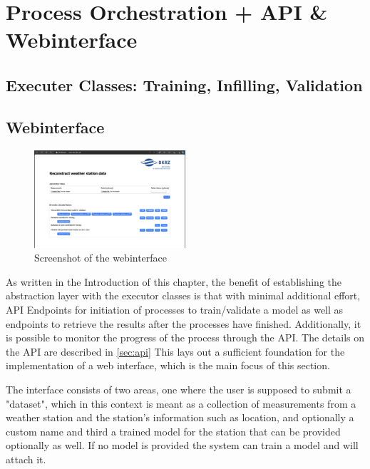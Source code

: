 
\section{Process Orchestration + API \& Webinterface}
\label{sec:process_orchestration}
\subsection{Executer Classes: Training, Infilling, Validation}


\subsection{Webinterface}

\begin{figure}
    \centering
    \includegraphics[width=0.5\textwidth]{resources/images/webinterface_screenshot.png}
    \caption{Screenshot of the webinterface}
    \label{fig:webinterface_screenshot}
\end{figure}

As written in the Introduction of this chapter, the benefit of establishing the abstraction layer with the executor classes is that with minimal additional effort, API Endpoints for initiation of processes to train/validate a model as well as endpoints to retrieve the results after the processes have finished. Additionally, it is possible to monitor the progress of the process through the API. The details on the API are described in \autoref{sec:api} This lays out a sufficient foundation for the implementation of a web interface, which is the main focus of this section.

The interface consists of two areas, one where the user is supposed to submit a "dataset", which in this context is meant as a collection of measurements from a weather station and the station's information such as location, and optionally a custom name and third a trained model for the station that can be provided optionally as well. If no model is provided the system can train a model and will attach it. 

